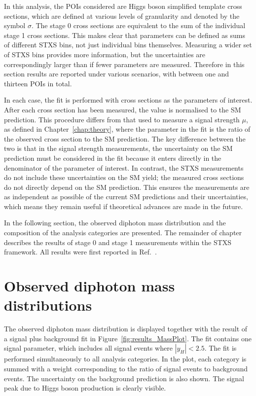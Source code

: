 In this analysis, the POIs considered are Higgs boson simplified template cross sections, 
which are defined at various levels of granularity and denoted by the symbol $\sigma$.
The stage 0 cross sections are equivalent 
to the sum of the individual stage 1 cross sections.
This makes clear that parameters can be defined as sums of different STXS bins, 
not just individual bins themselves.
Measuring a wider set of STXS bins provides more information, 
but the uncertainties are correspondingly larger than if fewer parameters are measured.
Therefore in this section results are reported under various scenarios, 
with between one and thirteen POIs in total.

In each case, the fit is performed with cross sections as the parameters of interest.
After each cross section has been measured, the value is normalised to the SM prediction. 
This procedure differs from that used to measure a signal strength $\mu$, 
as defined in Chapter~\ref{chap:theory},
where the parameter in the fit is the ratio of the observed cross section to the SM prediction.
The key difference between the two is that in the signal strength measurements,
the uncertainty on the SM prediction must be considered in the fit
because it enters directly in the denominator of the parameter of interest.
In contrast, the STXS measurements do not include these uncertainties on the SM yield;
the measured cross sections do not directly depend on the SM prediction.
This ensures the measurements are as independent as possible of the current SM predictions
and their uncertainties, 
which means they remain useful if theoretical advances are made in the future.

In the following section, the observed diphoton mass distribution
and the composition of the analysis categories are presented.
The remainder of chapter describes the results of stage 0 and stage 1 measurements 
within the STXS framework.
All results were first reported in Ref.~\cite{HIG-18-029}.

\section{Observed diphoton mass distributions}

The observed diphoton mass distribution is displayed together with the result 
of a signal plus background fit in Figure~\ref{fig:results_MassPlot}.
The fit contains one signal parameter, 
which includes all signal events where $|y_H| < 2.5$.
The fit is performed simultaneously to all analysis categories.
In the plot, each category is summed with a weight 
corresponding to the ratio of signal events to background events. %
The uncertainty on the background prediction is also shown.
The signal peak due to Higgs boson production is clearly visible.

